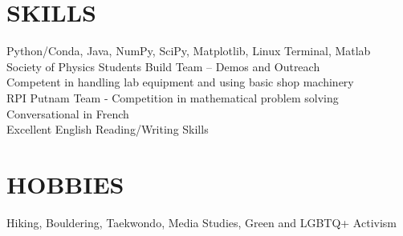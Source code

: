 \documentclass[margin]{rpires}
\begin{document}
\begin{resume}
\section{SKILLS}
Python/Conda, Java, NumPy, SciPy, Matplotlib, Linux Terminal, Matlab\\
Society of Physics Students Build Team – Demos and Outreach \\
Competent in handling lab equipment and using basic shop machinery\\
RPI Putnam Team - Competition in mathematical problem solving\\
Conversational in French\\
Excellent English Reading/Writing Skills \\

 
\section{HOBBIES}         Hiking, Bouldering, Taekwondo, Media Studies, Green and LGBTQ+ Activism
 
\end{resume} 
\end{document}
